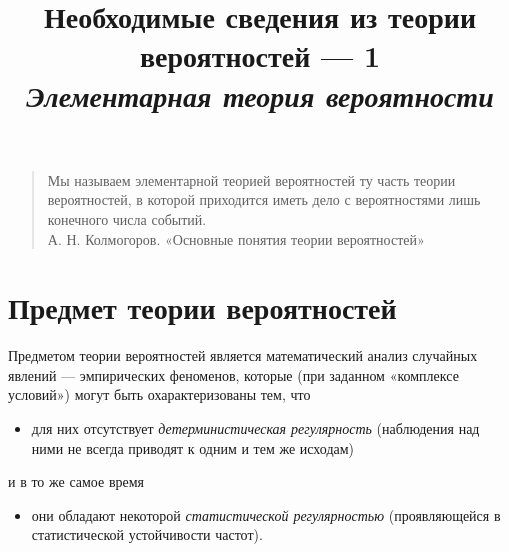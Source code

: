 \documentclass[11pt,a4paper]{article}
\title{
      Необходимые сведения из теории вероятностей --- 1\\
      \large \emph{Элементарная теория вероятности}
    }
\providecommand{\tightlist}{%
      \setlength{\itemsep}{0pt}\setlength{\parskip}{0pt}}
\begin{document}
    
    \maketitle
    
    

    
%

\begin{quote}
Мы называем элементарной теорией вероятностей ту часть теории
вероятностей, в которой приходится иметь дело с вероятностями лишь
конечного числа событий.\\
А. Н. Колмогоров. «Основные понятия теории вероятностей»
\end{quote}

    \hypertarget{ux43fux440ux435ux434ux43cux435ux442-ux442ux435ux43eux440ux438ux438-ux432ux435ux440ux43eux44fux442ux43dux43eux441ux442ux435ux439}{%
\section{Предмет теории
вероятностей}\label{ux43fux440ux435ux434ux43cux435ux442-ux442ux435ux43eux440ux438ux438-ux432ux435ux440ux43eux44fux442ux43dux43eux441ux442ux435ux439}}

    Предметом теории вероятностей является математический анализ случайных
явлений --- эмпирических феноменов, которые (при заданном «комплексе
условий») могут быть охарактеризованы тем, что

\begin{itemize}
\tightlist
\item
  для них отсутствует \emph{детерминистическая регулярность} (наблюдения
  над ними не всегда приводят к одним и тем же исходам)
\end{itemize}

и в то же самое время

\begin{itemize}
\tightlist
\item
  они обладают некоторой \emph{статистической регулярностью}
  (проявляющейся в статистической устойчивости частот).
\end{itemize}
\end{document}
